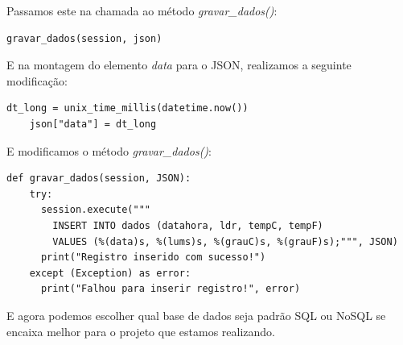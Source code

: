 \documentclass[a4paper,11pt]{article}
\begin{document}
Passamos este na chamada ao método \textit{gravar\_dados()}:
\begin{lstlisting}[]
	gravar_dados(session, json)
\end{lstlisting}

E na montagem do elemento \textit{data} para o JSON, realizamos a seguinte modificação:
\begin{lstlisting}[]
	dt_long = unix_time_millis(datetime.now())
	json["data"] = dt_long
\end{lstlisting}

E modificamos o método \textit{gravar\_dados()}:
\begin{lstlisting}[]
  def gravar_dados(session, JSON):
    try:
      session.execute("""
        INSERT INTO dados (datahora, ldr, tempC, tempF)
        VALUES (%(data)s, %(lums)s, %(grauC)s, %(grauF)s);""", JSON)
      print("Registro inserido com sucesso!")
    except (Exception) as error:
      print("Falhou para inserir registro!", error)
\end{lstlisting}

E agora podemos escolher qual base de dados seja padrão SQL ou NoSQL se encaixa melhor para o projeto que estamos realizando.
\end{document}
